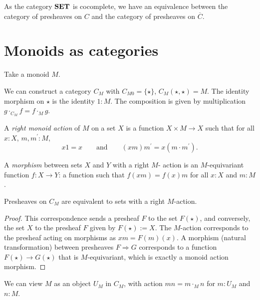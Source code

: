 \begin{corollary}
  As the category $ \mathbf{SET} $ is cocomplete, we have an equivalence between the category of presheaves on $ C $ and the category of presheaves on $ \overline C $.
\end{corollary}

\section{Monoids as categories}
Take a monoid $ M $.
\begin{definition}
  We can construct a category $ C_M $ with $ C_{M0} = \{ \star \} $, $ C_M(\star, \star) = M $. The identity morphism on $ \star $ is the identity $ 1: M $. The composition is given by multiplication $ g \cdot_{C_M} f = f \cdot_M g $.
\end{definition}

\begin{definition}
  A \textit{right monoid action} of $ M $ on a set $ X $ is a function $ X \times M \to X $ such that for all $ x: X $, $ m, m^\prime: M $,
  \[ x 1 = x \qquad \text{and} \qquad (x m) m^\prime = x (m \cdot m^\prime). \]
\end{definition}

\begin{definition}
  A \textit{morphism} between sets $ X $ and $ Y $ with a right $ M $- action is an $ M $-equivariant function $ f: X \to Y $: a function such that $ f(xm) = f(x)m $ for all $ x: X $ and $ m: M $.
\end{definition}

\begin{lemma}
  Presheaves on $ C_M $ are equivalent to sets with a right $ M $-action.
\end{lemma}
\begin{proof}
  This correspondence sends a presheaf $ F $ to the set $ F(\star) $, and conversely, the set $ X $ to the presheaf $ F $ given by $ F(\star) := X $. The $ M $-action corresponds to the presheaf acting on morphisms as $ xm = F(m)(x) $. A morphism (natural transformation) between presheaves $ F \Rightarrow G $ corresponds to a function $ F(\star) \to G(\star) $ that is $ M $-equivariant, which is exactly a monoid action morphism.
\end{proof}

\begin{definition}
  We can view $ M $ as an object $ U_M $ in $ C_M $, with action $ m n = m \cdot_M n $ for $ m: U_M $ and $ n: M $.
\end{definition}

